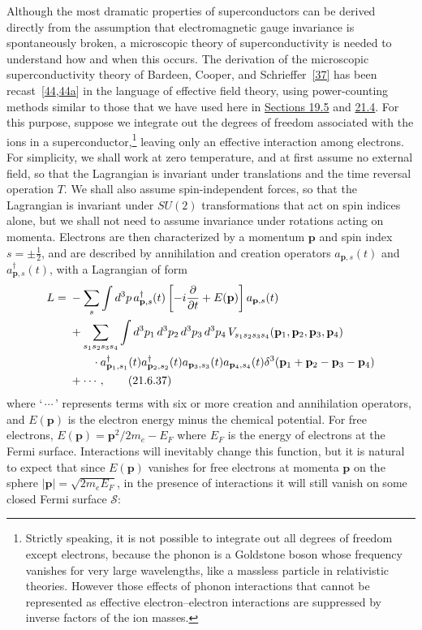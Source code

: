 Although the most dramatic properties of superconductors can be derived directly from the assumption that electromagnetic gauge invariance is spontaneously broken, a microscopic theory of superconductivity is needed to understand how and when this occurs. The derivation of the microscopic superconductivity theory of Bardeen, Cooper, and Schrieffer~\hyperref[ch21-ref-37]{[37]} has been recast~[\hyperref[ch21-ref-44]{44},\hyperref[ch21-ref-44a]{44a}] in the language of effective field theory, using power-counting methods similar to those that we have used here in \hyperref[sec:19.5]{Sections 19.5} and \hyperref[sec:21.4]{21.4}. For this purpose, suppose we integrate out the degrees of freedom associated with the ions in a superconductor,\footnote{Strictly speaking, it is not possible to integrate out all degrees of freedom except electrons, because the phonon is a Goldstone boson whose frequency vanishes for very large wavelengths, like a massless particle in relativistic theories. However those effects of phonon interactions that cannot be represented as effective electron--electron interactions are suppressed by inverse factors of the ion masses.} leaving only an effective interaction among electrons. For simplicity, we shall work at zero temperature, and at first assume no external field, so that the Lagrangian is invariant under translations and the time reversal operation $T$. We shall also assume spin-independent forces, so that the Lagrangian is invariant under $SU(2)$ transformations that act on spin indices alone, but we shall not need to assume invariance under rotations acting on momenta. Electrons are then characterized by a momentum $\mathbf p$ and spin index $s=\pm\frac12$, and are described by annihilation and creation operators $a_{\mathbf p,s}(t)$ and $a^\dagger_{\mathbf p,s}(t)$, with a Lagrangian of form
\begin{align}
L={}&-\sum_s\int d^3p\,
a^\dagger_{\mathbf p,s}(t)
\left[-i\frac{\partial}{\partial t}+E(\mathbf p)\right]
a_{\mathbf p,s}(t)
\notag\\
&+\sum_{s_1s_2s_3s_4}
\int d^3p_1\,d^3p_2\,d^3p_3\,d^3p_4\,
V_{s_1s_2s_3s_4}
(\mathbf p_1,\mathbf p_2,\mathbf p_3,\mathbf p_4)
\notag\\
&\qquad\cdot
a^\dagger_{\mathbf p_1,s_1}(t)
a^\dagger_{\mathbf p_2,s_2}(t)
a_{\mathbf p_3,s_3}(t)
a_{\mathbf p_4,s_4}(t)
\delta^3(\mathbf p_1+\mathbf p_2-\mathbf p_3-\mathbf p_4)
\notag\\
&+\cdots,
\tag{21.6.37}\label{eq:21.6.37}
\end{align}
where `$\,\cdots\,$' represents terms with six or more creation and annihilation operators, and $E(\mathbf p)$ is the electron energy minus the chemical potential. For free electrons, $E(\mathbf p)=\mathbf p^2/2m_e-E_F$ where $E_F$ is the energy of electrons at the Fermi surface. Interactions will inevitably change this function, but it is natural to expect that since $E(\mathbf p)$ vanishes for free electrons at momenta $\mathbf p$ on the sphere $|\mathbf p|=\sqrt{2m_eE_F}$, in the presence of interactions it will still vanish on some closed Fermi surface $\mathcal S$:
